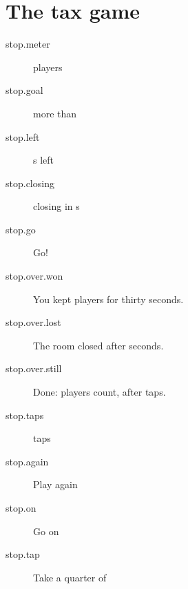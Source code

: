 \section{The tax game}

\begin{description}
  \item[stop.meter]  players
  \item[stop.goal] more than 
  \item[stop.left] s left
  \item[stop.closing] closing in s
  \item[stop.go] Go!
  \item[stop.over.won] You kept  players for thirty seconds.
  \item[stop.over.lost] The room closed after  seconds.
  \item[stop.over.still] Done:  players count, after  taps.
  \item[stop.taps]  taps
  \item[stop.again] Play again
  \item[stop.on] Go on
  \item[stop.tap] Take a quarter of 
\end{description}
